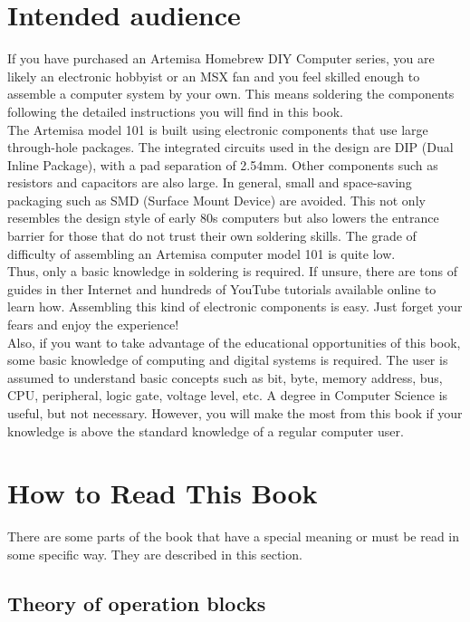 \section{Intended audience}

If you have purchased an Artemisa Homebrew DIY Computer series, you are likely an electronic hobbyist or an MSX fan and you feel skilled enough to assemble a computer system by your own. This means soldering the components following the detailed instructions you will find in this book. \\

The Artemisa model 101 is built using electronic components that use large through-hole packages. The integrated circuits used in the design are DIP (Dual Inline Package), with a pad separation of 2.54mm. Other components such as resistors and capacitors are also large. In general, small and space-saving packaging such as SMD (Surface Mount Device) are avoided. This not only resembles the design style of early 80s computers but also lowers the entrance barrier for those that do not trust their own soldering skills. The grade of difficulty of assembling an Artemisa computer model 101 is quite low. \\

Thus, only a basic knowledge in soldering is required. If unsure, there are tons of guides in ther Internet and hundreds of YouTube tutorials available online to learn how. Assembling this kind of electronic components is easy. Just forget your fears and enjoy the experience!\\

Also, if you want to take advantage of the educational opportunities of this book, some basic knowledge of computing and digital systems is required. The user is assumed to understand basic concepts such as bit, byte, memory address, bus, CPU, peripheral, logic gate, voltage level, etc. A degree in Computer Science is useful, but not necessary. However, you will make the most from this book if your knowledge is above the standard knowledge of a regular computer user.

\section{How to Read This Book}

There are some parts of the book that have a special meaning or must be read in some specific way. They are described in this section. 

\subsection{Theory of operation blocks}

